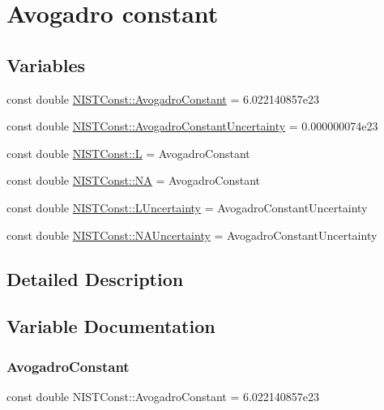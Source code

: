 \hypertarget{group___avogadro_constant}{}\section{Avogadro constant}
\label{group___avogadro_constant}
\subsection*{Variables}
\begin{DoxyCompactItemize}
\item 
const double \hyperlink{group___avogadro_constant_gad82b2a4777628c4e67a87b8f5b99174e}{N\+I\+S\+T\+Const\+::\+Avogadro\+Constant} = 6.\+022140857e23
\item 
const double \hyperlink{group___avogadro_constant_ga38f3e71e31d844bbfe2dfacf7100c4d1}{N\+I\+S\+T\+Const\+::\+Avogadro\+Constant\+Uncertainty} = 0.\+000000074e23
\item 
const double \hyperlink{group___avogadro_constant_ga0d410e47da7c9d6841958899d80e4b75}{N\+I\+S\+T\+Const\+::L} = Avogadro\+Constant
\item 
const double \hyperlink{group___avogadro_constant_gad08af58ac1b1ee41e25bd8564a74bc42}{N\+I\+S\+T\+Const\+::\+NA} = Avogadro\+Constant
\item 
const double \hyperlink{group___avogadro_constant_ga76105d1e09dbaed0913932aa743ef03d}{N\+I\+S\+T\+Const\+::\+L\+Uncertainty} = Avogadro\+Constant\+Uncertainty
\item 
const double \hyperlink{group___avogadro_constant_ga37f2994955ace9aed8e44bd3699f0b50}{N\+I\+S\+T\+Const\+::\+N\+A\+Uncertainty} = Avogadro\+Constant\+Uncertainty
\end{DoxyCompactItemize}


\subsection{Detailed Description}


\subsection{Variable Documentation}
\mbox{\label{group___avogadro_constant_gad82b2a4777628c4e67a87b8f5b99174e}} 
\subsubsection{\texorpdfstring{Avogadro\+Constant}{AvogadroConstant}}
{\footnotesize\ttfamily const double N\+I\+S\+T\+Const\+::\+Avogadro\+Constant = 6.\+022140857e23}

